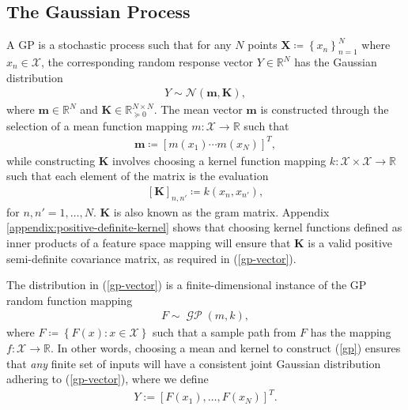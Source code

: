 \documentclass{article}
\newcommand{\GP}{\operatorname{\mathcal{GP}}}
\numberwithin{equation}{section}
\begin{document}
\subsection{The Gaussian Process}\label{section:the-gp}
A GP is a stochastic process such that for any $N$ points $\mathbf{X} \coloneqq \left\{ x_n\right\}_{n=1}^N$ where $x_n \in \mathcal{X}$, the corresponding random response vector $Y \in \mathbb{R}^N$ has the Gaussian distribution
\begin{align}
    \label{gp-vector}
    Y \sim \mathcal{N}\left(\mathbf{m}, \mathbf{K}\right),
\end{align}
where $\mathbf{m} \in \mathbb{R}^N$ and $\mathbf{K} \in  \mathbb{R}^{N \times N}_{\succcurlyeq 0}$.
The mean vector $\mathbf{m}$ is constructed through the selection of a mean function mapping $m: \mathcal{X} \rightarrow \mathbb{R}$ such that
\begin{align}
    \label{gp-mean-vector}
    \mathbf{m} \coloneqq \left[ m(x_1) \cdots m(x_N)\right]^T,
\end{align}
while constructing $\mathbf{K}$ involves choosing a kernel function mapping $k: \mathcal{X} \times \mathcal{X} \rightarrow \mathbb{R}$ such that each element of the matrix is the evaluation
\begin{align}
    \label{gp-kernel-matrix}
    \left[\mathbf{K}\right]_{n, n'} \coloneqq k(x_n, x_{n'}),
\end{align}
for $n, n'=1,\dots, N$.
$\mathbf{K}$ is also known as the gram matrix.
Appendix \ref{appendix:positive-definite-kernel} shows that choosing kernel functions defined as inner products of a feature space mapping will ensure that $\mathbf{K}$ is a valid positive semi-definite covariance matrix, as required in (\ref{gp-vector}).


The distribution in (\ref{gp-vector}) is a finite-dimensional instance of the GP random function mapping
\begin{align}
    F \sim \GP(m, k),
    \label{gp}
\end{align}
 where $F \coloneqq \left\{F(x): x \in \mathcal{X}\right\}$ such that a sample path from $F$ has the mapping $f: \mathcal{X} \rightarrow \mathbb{R}$.
In other words, choosing a mean and kernel to construct (\ref{gp}) ensures that \textit{any} finite set of inputs will have a consistent joint Gaussian distribution adhering to (\ref{gp-vector}), where we define 
\begin{align}
    Y:=\left[F(x_1),\hdots, F(x_N)\right]^T.
\end{align}
\end{document}
